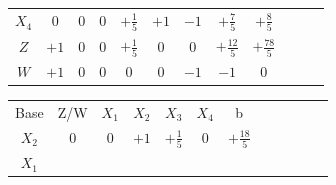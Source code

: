\documentclass{beamer}
\begin{document}
\begin{frame}
{\begin{table}
\begin{tabular}{c c c c c c c c c c c c}
				\cellcolor{blue!100} \color{red} $\scriptstyle X_4$
				& \cellcolor{yellow!50} $\scriptstyle 0$
				& \cellcolor{yellow!50} $\scriptstyle 0$
				& \cellcolor{yellow!50} $\scriptstyle 0$
				& \cellcolor{yellow!50} $\scriptstyle +\frac{1}{5}$
				& \cellcolor{yellow!50} $\scriptstyle +1$
				& \cellcolor{olive!90} $\scriptstyle -1$
				& \cellcolor{olive!90} $\scriptstyle +\frac{7}{5}$
				& \cellcolor{yellow!50} $\scriptstyle +\frac{8}{5}$ \\
				\cellcolor{blue!100} \color{white} $\scriptstyle Z$
				& \cellcolor{yellow!50} $\scriptstyle +1$
				& \cellcolor{yellow!50} $\scriptstyle 0$
				& \cellcolor{yellow!50} $\scriptstyle 0$
				& \cellcolor{yellow!50} $\scriptstyle +\frac{1}{5}$
				& \cellcolor{yellow!50} $\scriptstyle 0$
				& \cellcolor{olive!90} $\scriptstyle 0$
				& \cellcolor{olive!90} $\scriptstyle +\frac{12}{5}$ 
				& \cellcolor{yellow!50} $\scriptstyle +\frac{78}{5}$  \\
				\cellcolor{olive!100} \color{white} $\scriptstyle W$
				& \cellcolor{olive!90} $\scriptstyle +1$
				& \cellcolor{olive!90} $\scriptstyle 0$
				& \cellcolor{olive!90} $\scriptstyle 0$
				& \cellcolor{olive!90} $\scriptstyle 0$
				& \cellcolor{olive!90} $\scriptstyle 0$
				& \cellcolor{olive!90} $\scriptstyle -1$
				& \cellcolor{olive!90} $\scriptstyle -1$ 
				& \cellcolor{olive!90} $\scriptstyle 0$  \\
			\end{tabular}
		\end{table}			
	}		
	{
		\begin{table}		
			\begin{tabular}{c c c c c c c c c c c c}
				\cellcolor{blue!100} \color{white} \scriptsize Base 
				&\cellcolor{blue!100} \color{white} \scriptsize Z/W
				&\cellcolor{blue!100} \color{red} $\scriptstyle X_1$ 
				&\cellcolor{blue!100} \color{red} $\scriptstyle X_2$ 
				&\cellcolor{blue!100} \color{white}   $\scriptstyle X_3$ 
				&\cellcolor{blue!100} \color{red} $\scriptstyle X_4$ 
				&\cellcolor{blue!100} \color{white} \scriptsize b
				&
				&
				& \\
				\cellcolor{blue!100} \color{red} $\scriptstyle X_2$
				& \cellcolor{yellow!50} $\scriptstyle 0$
				& \cellcolor{yellow!50} $\scriptstyle 0$
				& \cellcolor{yellow!50} $\scriptstyle +1$
				& \cellcolor{yellow!50} $\scriptstyle +\frac{1}{5}$
				& \cellcolor{yellow!50} $\scriptstyle 0$
				& \cellcolor{yellow!50} $\scriptstyle +\frac{18}{5}$ \\
			    \cellcolor{blue!100} \color{red} $\scriptstyle X_1$

\end{tabular}
\end{table}}
\end{frame}
\end{document}
